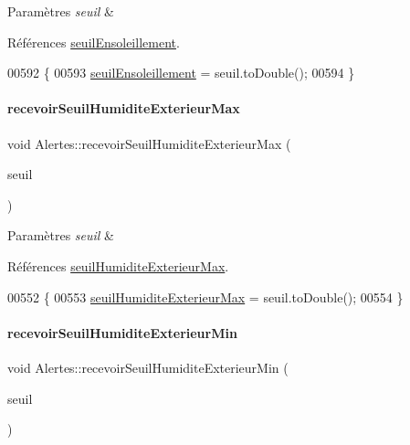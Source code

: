 \begin{DoxyParams}{Paramètres}
{\em seuil} & \\
\hline
\end{DoxyParams}


Références \hyperlink{class_alertes_a7f512b6d3b5bc0851757ab4d18279ccf}{seuil\+Ensoleillement}.


\begin{DoxyCode}
00592 \{
00593     \hyperlink{class_alertes_a7f512b6d3b5bc0851757ab4d18279ccf}{seuilEnsoleillement} = seuil.toDouble();
00594 \}
\end{DoxyCode}
\mbox{\label{class_alertes_a8c8500d99314034be3c01a871f209fb8}} 
\paragraph{\texorpdfstring{recevoir\+Seuil\+Humidite\+Exterieur\+Max}{recevoirSeuilHumiditeExterieurMax}}
{\footnotesize\ttfamily void Alertes\+::recevoir\+Seuil\+Humidite\+Exterieur\+Max (\begin{DoxyParamCaption}\item[{Q\+String}]{seuil }\end{DoxyParamCaption})\hspace{0.3cm}{\ttfamily [slot]}}


\begin{DoxyParams}{Paramètres}
{\em seuil} & \\
\hline
\end{DoxyParams}


Références \hyperlink{class_alertes_afa54793d1f47a97894faf91e76fb2a04}{seuil\+Humidite\+Exterieur\+Max}.


\begin{DoxyCode}
00552 \{
00553     \hyperlink{class_alertes_afa54793d1f47a97894faf91e76fb2a04}{seuilHumiditeExterieurMax} = seuil.toDouble();
00554 \}
\end{DoxyCode}
\mbox{\label{class_alertes_a021d167be6c98d9b0718bb9c7209b47e}} 
\paragraph{\texorpdfstring{recevoir\+Seuil\+Humidite\+Exterieur\+Min}{recevoirSeuilHumiditeExterieurMin}}
{\footnotesize\ttfamily void Alertes\+::recevoir\+Seuil\+Humidite\+Exterieur\+Min (\begin{DoxyParamCaption}\item[{Q\+String}]{seuil }\end{DoxyParamCaption})\hspace{0.3cm}{\ttfamily [slot]}}


